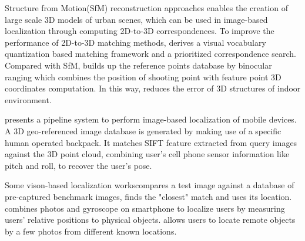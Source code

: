 Structure from Motion(SfM) reconstruction approaches enables the creation of large scale 3D models of urban scenes\cite{torsten2011fast}, which can be used in image-based localization through computing 2D-to-3D correspondences.
To improve the performance of 2D-to-3D matching methods, \cite{torsten2011fast} derives a visual vocabulary quantization based matching framework and a prioritized correspondence search. Compared with SfM, \oursystem builds up the reference points database by binocular ranging which combines the position of shooting point with feature point 3D coordinates computation. In this way, \oursystem reduces the error of 3D structures of indoor environment.

\cite{jason2013image} presents a pipeline system to perform image-based localization of mobile devices.
A 3D geo-referenced image database is generated by making use of a specific human operated backpack.
It matches SIFT feature extracted from query images against the 3D point cloud, combining user's cell phone sensor information like pitch and roll, to recover the user's pose.

Some vison-based localization works\cite{kosecka2003qualitative}\cite{kosecka2003qualitative}\cite{ulrich2000appearance}compares a test image against a database of pre-captured benchmark images, finds the "closest" match and uses its location. \cite{tian2014towards} combines photos and gyroscope on smartphone to localize users by measuring users' relative positions to physical objects. \cite{manweiler2012satellites} allows users to locate remote objects by a few photos from different known locations.
